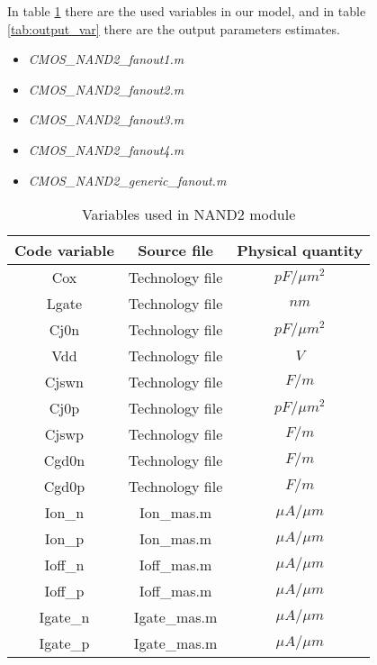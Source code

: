 In table \ref{tab:input_dep} there are the used variables in our model, and in table \ref{tab:output_var} there are the output parameters estimates.
\begin{itemize}
\item \emph{CMOS\_NAND2\_fanout1.m}\\
\item \emph{CMOS\_NAND2\_fanout2.m}\\
\item \emph{CMOS\_NAND2\_fanout3.m}\\
\item \emph{CMOS\_NAND2\_fanout4.m}\\
\item \emph{CMOS\_NAND2\_generic\_fanout.m}
\end{itemize}
\begin{table}[htdp]
\begin{center}
\begin{tabular}{|c|c|c|}
\hline
Code variable & Source file & Physical quantity\\
\hline
Cox & Technology file & $pF/\mu m^2$\\
\hline
Lgate & Technology file & $nm$\\
\hline
Cj0n & Technology file & $pF/\mu m^2$\\
\hline
Vdd & Technology file & $V$\\
\hline
Cjswn & Technology file & $F/m$\\
\hline
Cj0p & Technology file & $pF/\mu m^2$\\
\hline
Cjswp & Technology file & $F/m$\\
\hline
Cgd0n & Technology file & $F/m$\\
\hline
Cgd0p & Technology file & $F/m$\\
\hline
Ion\_n & Ion\_mas.m & $\mu A/\mu m$\\
\hline
Ion\_p & Ion\_mas.m & $\mu A/\mu m$\\
\hline
Ioff\_n & Ioff\_mas.m & $\mu A/\mu m$\\
\hline
Ioff\_p & Ioff\_mas.m & $\mu A/\mu m$\\
\hline
Igate\_n & Igate\_mas.m & $\mu A/\mu m$\\
\hline
Igate\_p & Igate\_mas.m & $\mu A/\mu m$\\
\hline
\end{tabular}
\end{center}
\caption{Variables used in NAND2 module}
\label{tab:input_dep}
\end{table}
